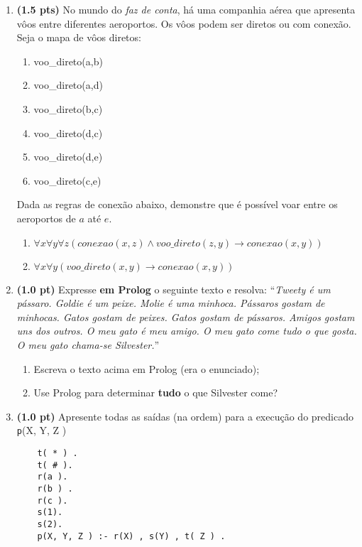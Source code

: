 \documentclass[11pt, a4paper,final]{article}
\begin{document}
\begin{enumerate}
\item {\bf (1.5 pts)} No mundo do {\em faz de conta}, há uma
companhia aérea que apresenta vôos entre diferentes
aeroportos. Os vôos podem ser diretos ou com conexão.
Seja o mapa de vôos diretos:
\begin{enumerate}
\setlength{\itemsep}{-2pt}
    \item voo\_direto(a,b)
    \item voo\_direto(a,d)
    \item voo\_direto(b,c)
    \item voo\_direto(d,c)
    \item voo\_direto(d,e)
    \item voo\_direto(c,e)
\end{enumerate}
Dada as regras de conexão abaixo, demonstre que é possível
voar entre os aeroportos de $a$ até $e$.
\begin{enumerate}
\setlength{\itemsep}{-2pt}
  \item  $\forall x \forall y \forall z ( conexao(x,z) \wedge voo\_direto(z,y) \rightarrow  conexao(x,y) )$
\item $\forall x \forall y (voo\_direto(x,y)  \rightarrow  conexao(x,y) )$
\end{enumerate}


\item {\bf (1.0 pt)} Expresse {\bf em Prolog} o seguinte texto e resolva: 
``\textit{Tweety é um pássaro. Goldie é um peixe. Molie é uma minhoca. Pássaros gostam de minhocas. Gatos gostam de peixes. Gatos gostam de pássaros. Amigos gostam uns dos outros. O meu gato é meu amigo. O meu gato come tudo o que gosta. O meu gato chama-se Silvester.}''

\begin{enumerate}
  \item Escreva o texto acima em Prolog (era o enunciado);
  \item Use Prolog para determinar {\bf tudo} o que Silvester come?
\end{enumerate}

\item {\bf (1.0 pt)} Apresente todas as saídas (na ordem) para a execução do predicado {\texttt p(X, Y, Z )}

\begin{verbatim}
	t( * ) .
	t( # ).
	r(a ).
	r(b ) .
	r(c ).
	s(1).
	s(2).
	p(X, Y, Z ) :- r(X) , s(Y) , t( Z ) .
\end{verbatim}



\end{enumerate}
\end{document}
